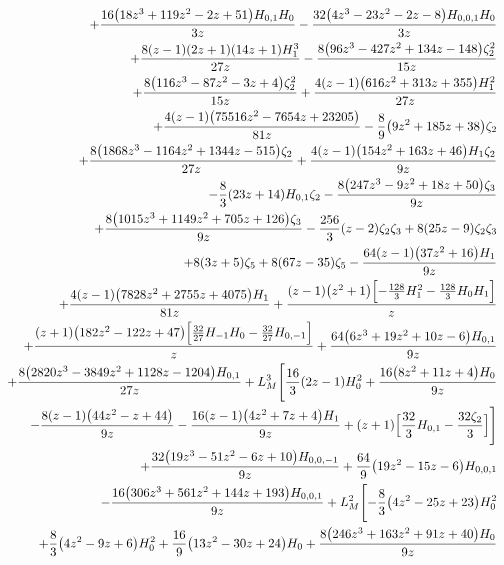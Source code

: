 \begin{eqnarray}
\nonumber\\&&
+\frac{16 \big(18 z^3+119 z^2-2 z+51\big) H_{0,1} H_0}{3 z}-\frac{32 \big(4  z^3-23 z^2-2 z-8\big) H_{0,0,1} H_0}{3 z}
\nonumber\\&&
+\frac{8 (z-1) (2 z+1) (14 z+1) H_1^3}{27 z}-\frac{8 \big(96 z^3-427 z^2+134  z-148\big) \zeta_2^2}{15 z}
\nonumber\\&&
+\frac{8  \big(116 z^3-87 z^2-3 z+4\big) \zeta_2^2}{15 z}+\frac{4  (z-1) \big(616 z^2+313 z+355\big) H_1^2}{27 z}
\nonumber\\&&
+\frac{4 (z-1) \big(75516 z^2-7654 z+23205\big)}{81 z}-\frac{8}{9} \big(9 z^2+185 z+38\big) \zeta_2
\nonumber \\
&&
+\frac{8 \big(1868 z^3-1164 z^2+1344 z-515\big) \zeta_2}{27 z}+\frac{4  (z-1) \big(154 z^2+163 z+46\big) H_1 \zeta_2}{9 z}
\nonumber\\&&
-\frac{8}{3} (23 z+14) H_{0,1} \zeta_2-\frac{8  \big(247 z^3-9  z^2+18 z+50\big) \zeta_3}{9 z}
\nonumber\\&&
+\frac{8 \big(1015 z^3+1149 z^2+705 z+126\big) \zeta_3}{9  z}-\frac{256}{3} (z-2) \zeta_2 \zeta_3+8  (25 z-9)
\zeta_2 \zeta_3
\nonumber\\&&
+8  (3 z+5) \zeta_5+8 (67 z-35) \zeta_5-\frac{64  (z-1)  \big(37 z^2+16\big) H_1}{9 z}
\nonumber\\&&
+\frac{4 (z-1) \big(7828 z^2+2755 z+4075\big) H_1}{81 z}+\frac{(z-1)  \big(z^2+1\big) \Bigl[-\frac{128}{3}  H_1^2-\frac{128}{3}  H_0  H_1\Bigr]}{z}
\nonumber\\&&
+\frac{(z+1) \big(182 z^2-122 z+47\big) \Bigl[\frac{32}{27} H_{-1}  H_0-\frac{32}{27} H_{0,-1}\Bigr]}{z}+\frac{64  \big(6 z^3+19 z^2+10  z-6\big) H_{0,1}}{9 z}
\nonumber\\&&
+\frac{8 \big(2820 z^3-3849 z^2+1128 z-1204\big) H_{0,1}}{27 z}
+L_M^3
\Biggl[\frac{16}{3} (2 z-1) H_0^2+\frac{16 \big(8  z^2+11 z+4\big) H_0}{9 z}
\nonumber\\&&
-\frac{8 (z-1) \big(44 z^2-z+44\big)}{9 z}-\frac{16 (z-1) \big(4 z^2+7  z+4\big) H_1}{9 z}+(z+1) \Bigl[\frac{32}{3} H_{0,1}-\frac{32 \zeta_2}{3}\Bigr]\Biggr]
\nonumber\\&&
+\frac{32 \big(19 z^3-51 z^2-6 z+10\big) H_{0,0,-1}}{9 z}+\frac{64}{9} \big(19 z^2-15 z-6\big) H_{0,0,1}
\nonumber\\&&
-\frac{16 \big(306 z^3+561 z^2+144 z+193\big) H_{0,0,1}}{9 z}
+L_M^2
\Biggl[-\frac{8}{3} \big(4 z^2-25 z+23\big) H_0^2
\nonumber\\&&
+\frac{8}{3}  \big(4 z^2-9 z+6\big) H_0^2+\frac{16}{9}  \big(13z^2-30 z+24\big) H_0+\frac{8 \big(246 z^3+163 z^2+91 z+40\big) H_0}{9 z}

\end{eqnarray}
